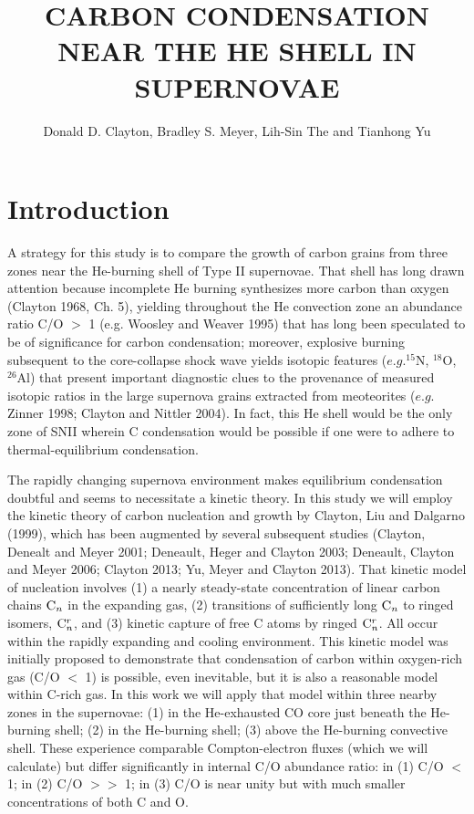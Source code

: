 \documentclass[manuscript]{aastex}
\newcommand{\cenn}{{\rm C}_n}
\newcommand{\cnr}{{\rm C}_n^r}
\begin{document}
\title{CARBON CONDENSATION NEAR THE HE SHELL IN SUPERNOVAE}

\author{Donald D. Clayton, Bradley S. Meyer, Lih-Sin The and Tianhong Yu}

\begin{abstract}
\end{abstract}


\section{Introduction}

A strategy for this study is to compare the growth of carbon grains from 
three zones near the He-burning shell of Type II supernovae. That shell 
has long drawn attention because incomplete He burning synthesizes more 
carbon than oxygen (Clayton 1968, Ch. 5), yielding throughout the He 
convection zone an abundance ratio C/O $>$ 1 (e.g. Woosley and Weaver 1995) 
that has long been speculated to be of significance for carbon condensation; 
moreover, explosive burning subsequent to the core-collapse shock wave 
yields isotopic features ($e.g. ^{15}$N, $^{18}$O, $^{26}$Al) 
that present important diagnostic clues to the provenance of measured 
isotopic ratios in the large supernova grains extracted from meoteorites 
($e.g.$ Zinner 1998; Clayton and Nittler 2004). 
In fact, this He shell would be the only zone of SNII wherein C condensation 
would be possible if one were to adhere to thermal-equilibrium condensation. 

The rapidly changing supernova environment makes equilibrium condensation 
doubtful and seems to necessitate a kinetic theory. In this study we 
will employ the kinetic theory of carbon nucleation and growth by 
Clayton, Liu and Dalgarno (1999), which has been augmented by 
several subsequent studies (Clayton, Denealt and Meyer 2001; 
Deneault, Heger and Clayton 2003; Deneault, 
Clayton and Meyer 2006; Clayton 2013; 
Yu, Meyer and Clayton 2013). 
That kinetic model of nucleation involves (1) a nearly steady-state 
concentration of linear carbon chains $\cenn$ in the expanding gas, 
(2) transitions of sufficiently long $\cenn$ to ringed isomers, $\cnr$, 
and (3) kinetic capture of free C atoms by ringed $\cnr$. All occur within 
the rapidly expanding and cooling environment. This kinetic model was 
initially proposed to demonstrate that condensation of carbon within 
oxygen-rich gas (C/O $<$ 1) is possible, even inevitable, but it is also a 
reasonable model within C-rich gas. In this work we will apply that model 
within three nearby zones in the supernovae: (1) in the He-exhausted CO core 
just beneath the He-burning shell; (2) in the He-burning shell; (3) above the 
He-burning convective shell. These experience comparable Compton-electron 
fluxes (which we will calculate) but differ significantly in internal 
C/O abundance ratio: in (1) C/O $<$ 1; in (2) C/O $>>$ 1; in (3) C/O is near 
unity but with much smaller concentrations of both C and O. 
\end{document}
